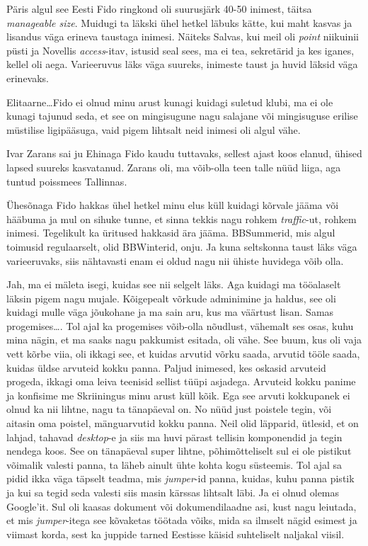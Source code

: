 Päris algul see Eesti Fido ringkond oli suurusjärk 40-50 inimest, täitsa 
\emph{manageable size}. Muidugi ta läkski ühel hetkel  läbuks kätte, kui 
maht kasvas ja lisandus väga erineva taustaga inimesi. Näiteks Salvas, kui meil 
oli \emph{point} niikuinii püsti ja Novellis \emph{access}-itav, istusid seal sees, ma 
ei tea, sekretärid ja kes iganes, kellel oli aega. Varieeruvus läks väga 
suureks, inimeste taust ja huvid läksid väga erinevaks. 


Elitaarne\ldots Fido ei olnud minu arust kunagi kuidagi suletud klubi,  ma ei ole 
kunagi tajunud seda, et see on mingisugune nagu salajane või mingisuguse 
erilise müstilise ligipääsuga, vaid pigem lihtsalt neid inimesi oli algul vähe. 

Ivar Zarans sai ju Ehinaga 
Fido kaudu tuttavaks, sellest ajast koos elanud, ühised lapsed suureks 
kasvatanud. Zarans oli, ma võib-olla teen talle nüüd liiga, aga tuntud 
poissmees Tallinnas. 

Ühesõnaga Fido hakkas ühel hetkel minu elus küll kuidagi kõrvale jääma või 
hääbuma ja mul on sihuke tunne, et sinna tekkis nagu rohkem \emph{traffic}-ut, 
rohkem inimesi. Tegelikult ka  üritused hakkasid ära jääma. BBSummerid, 
mis algul toimusid regulaarselt, olid BBWinterid, onju. Ja kuna  seltskonna 
taust  läks väga varieeruvaks, siis nähtavasti enam ei oldud nagu nii ühiste 
huvidega võib olla. 


Jah, ma ei mäleta isegi, kuidas see nii selgelt läks. Aga kuidagi ma tööalaselt 
läksin pigem nagu mujale. Kõigepealt võrkude adminimine ja haldus, see oli 
kuidagi mulle väga jõukohane ja ma sain aru, kus ma väärtust lisan. Samas 
progemises\ldots. Tol ajal ka progemises võib-olla nõudlust, vähemalt ses osas, 
kuhu mina nägin, et ma saaks nagu pakkumist esitada, oli vähe. See  buum, kus 
oli vaja vett kõrbe viia, oli ikkagi see, et kuidas arvutid võrku saada, 
arvutid tööle saada, kuidas üldse arvuteid kokku panna. Paljud inimesed, kes 
oskasid arvuteid progeda, ikkagi oma leiva teenisid sellist tüüpi asjadega. 
Arvuteid kokku panime ja konfisime me Skriiningus  minu arust küll kõik. 
Ega see arvuti kokkupanek ei olnud ka nii lihtne, nagu ta tänapäeval on. No 
nüüd just poistele tegin, või aitasin oma poistel, mänguarvutid  kokku panna. 
Neil olid läpparid, ütlesid, et  on lahjad, tahavad \emph{desktop}-e ja 
siis ma huvi pärast tellisin komponendid ja tegin nendega koos. See on 
tänapäeval super lihtne, põhimõtteliselt sul ei ole pistikut võimalik valesti 
panna, ta läheb ainult ühte kohta kogu süsteemis. Tol ajal sa pidid ikka väga 
täpselt teadma, mis \emph{jumper}-id panna, kuidas, kuhu panna pistik ja kui sa 
tegid seda valesti siis masin kärssas lihtsalt läbi. Ja ei olnud olemas 
Google'it. Sul oli kaasas dokument või dokumendilaadne asi, kust nagu leiutada, 
et mis \emph{jumper}-itega see kõvaketas töötada võiks, mida sa ilmselt nägid 
esimest ja viimast korda, sest  ka  juppide tarned Eestisse käisid suhteliselt 
naljakal viisil. 

